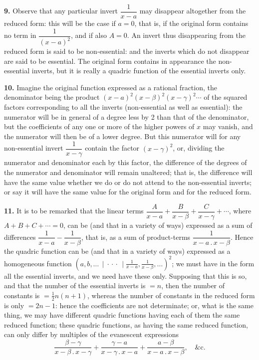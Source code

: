 \documentclass[11pt]{article}
\newcommand{\artno}[1]{\textbf{#1.}\quad}
\begin{document}
\artno{9} Observe that any particular invert $\dfrac{1}{x-a}$ may disappear altogether from the
reduced form: this will be the case if $a = 0$, that is, if the original form contains no
term in $\dfrac{1}{(x-a)^{2}}$, and if also $A = 0$. An invert thus disappearing from the reduced
form is said to be non-essential: and the inverts which do not disappear are said to
be essential. The original form contains in appearance the non-essential inverts, but
it is really a quadric function of the essential inverts only.

\artno{10} Imagine the original function expressed as a rational fraction, the denominator
being the product $(x-a)^{2}(x-\beta)^{2}(x-\gamma)^{2}\cdots$ of the squared factors corresponding to all
the inverts (non-essential as well as essential): the numerator will be in general of a
degree less by 2 than that of the denominator, but the coefficients of any one or
more of the higher powers of $x$ may vanish, and the numerator will then be of a
lower degree. But this numerator will for any non-essential invert $\dfrac{1}{x-\gamma}$ contain the
factor $(x-\gamma)^{2}$, or, dividing the numerator and denominator each by this factor, the
difference of the degrees of the numerator and denominator will remain unaltered;
that is, the difference will have the same value whether we do or do not attend to
the non-essential inverts; or say it will have the same value for the original form and
for the reduced form.

\artno{11} It is to be remarked that the linear terms $\dfrac{A}{x-a} + \dfrac{B}{x-\beta} + \dfrac{C}{x-\gamma} + \cdots$, where
$A + B + C + \cdots = 0$, can be (and that in a variety of ways) expressed as a sum of
differences $\dfrac{1}{x-a} - \dfrac{1}{x-\beta}$, that is, as a sum of product-terms $\dfrac{1}{x-a \,.\, x-\beta}$. Hence the
quadric function can be (and that in a variety of ways) expressed as a homogeneous
function $(a, b, \ldots \,\mid\!\!\cdot\!\!\cdot\!\!\cdot\,\mid \frac{1}{x-a}, \frac{1}{x-\beta}, \ldots)^{\!2}$; we must have in the form all the essential inverts,
and we need have these only. Supposing that this is so, and that the number of
the essential inverts is $=n$, then the number of constants is $=\tfrac{1}{2}n(n+1)$, whereas the
number of constants in the reduced form is only $=2n-1$: hence the coefficients are
not determinate; or, what is the same thing, we may have different quadric functions
having each of them the same reduced function; these quadric functions, as having
the same reduced function, can only differ by multiples of the evanescent expressions
\[
   \frac{\beta-\gamma}{x-\beta \,.\, x-\gamma} + \frac{\gamma-a}{x-\gamma \,.\, x-a} + \frac{a-\beta}{x-a \,.\, x-\beta}, \quad \&\text{c.}
\]
\end{document}
